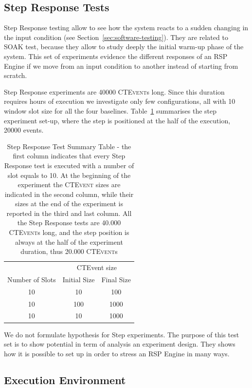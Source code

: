 \subsection{Step Response Tests}\label{sec:step-es}

Step Response testing allow to see how the system reacts to a sudden changing in the input condition (see Section~\ref{sec:software-testing}). They are related to SOAK test, because they allow to study deeply the initial warm-up phase of the system. This set of experiments evidence the different responses of an RSP Engine if we move from an input condition to another instead of starting from scratch.

Step Response experiments are 40000 \textsc{CTEvent}s long. Since this duration requires hours of execution we investigate only few configurations, all with 10 window slot size for all the four baselines. Table~\ref{tab:steptests} summarises the step experiment set-up, where the step is positioned at the half of the execution, 20000 events.
\begin{table}[htb]
\centering
 \begin{tabular}{c|c|c}
	  	\hline
	  	&\multicolumn{2}{c}{CTEvent size}  \\
		Number of Slots & Initial Size & Final Size\\
		\hline
		\hline
		 10 & 10 & 100\\
		 10 & 100 & 1000\\
		 10 & 10 & 1000\\
		\hline 
 \end{tabular}
 \caption[Step Response Tests Summary Table]{Step Response Test Summary Table -  the first column indicates that every Step Response test is executed with a number of slot equals to 10. At the beginning of the experiment the \textsc{CTEvent} sizes are indicated in the second column, while their sizes at the end of the experiment is reported in the third and last column. All the Step Response tests are 40.000 \textsc{CTEvent}s long, and the step position is always at the half of the experiment duration, thus 20.000 \textsc{CTEvent}s}
\label{tab:steptests}
\end{table}

We do not formulate hypothesis for Step experiments. The purpose of this test set is to show \name potential in term of analysis an experiment design. They shows how it is possible to set up \name in order to stress an RSP Engine in many ways.

\subsection{Execution Environment}\label{sec:execution-environment}

